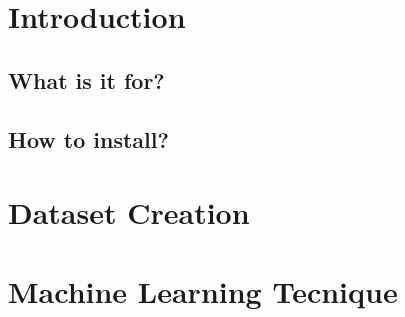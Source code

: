 \documentclass{article}
\begin{document}
	\newpage

	\section{Introduction}
		\subsection{What is it for?}
		\subsection{How to install?}
	\section{Dataset Creation}
	\section{Machine Learning Tecnique}
\end{document}
